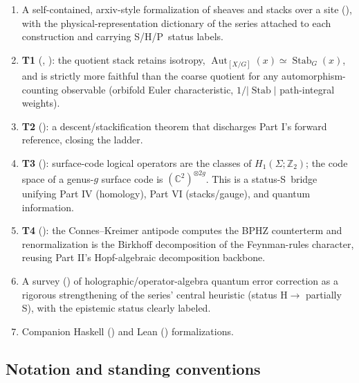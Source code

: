 \documentclass[12pt]{article}
\theoremstyle{definition}
\theoremstyle{remark}
\newcommand{\Aut}{\operatorname{Aut}}
\newcommand{\Stab}{\operatorname{Stab}}
\newcommand{\quot}[2]{[#1/#2]}
\newcommand{\ZZ}{\mathbb{Z}}
\newcommand{\CC}{\mathbb{C}}
\newcommand{\Ss}{\textsf{S}}
\newcommand{\Hh}{\textsf{H}}
\newcommand{\Pp}{\textsf{P}}
\begin{document}
\begin{enumerate}
\item A self-contained, arxiv-style formalization of sheaves and stacks over a site
(), with the physical-representation dictionary of the
series attached to each construction and carrying \Ss/\Hh/\Pp\ status labels.

\item \textbf{T1} (, ): the quotient stack
retains isotropy, $\Aut_{\quot{X}{G}}(x)\simeq\Stab_G(x)$, and is strictly more
faithful than the coarse quotient for any automorphism-counting observable (orbifold
Euler characteristic, $1/|\Stab|$ path-integral weights).

\item \textbf{T2} (): a descent/stackification theorem that
discharges Part I's forward reference, closing the ladder.

\item \textbf{T3} (): surface-code logical operators are the
classes of $H_1(\Sigma;\ZZ_2)$; the code space of a genus-$g$ surface code is
$(\CC^2)^{\otimes 2g}$. This is a status-\Ss\ bridge unifying Part IV (homology), Part
VI (stacks/gauge), and quantum information.

\item \textbf{T4} (): the Connes--Kreimer antipode computes
the BPHZ counterterm and renormalization is the Birkhoff decomposition of the
Feynman-rules character, reusing Part II's Hopf-algebraic decomposition backbone.

\item A survey () of holographic/operator-algebra quantum error
correction as a rigorous strengthening of the series' central heuristic (status
\Hh$\to$ partially \Ss), with the epistemic status clearly labeled.

\item Companion Haskell () and
Lean () formalizations.
\end{enumerate}

\subsection{Notation and standing conventions}
\label{subsec:notation}
\end{document}
